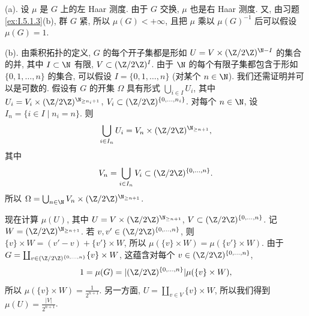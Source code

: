 \begin{solution}
(a). 设 $\mu$ 是 $G$ 上的左 Haar 测度. 由于 $G$ 交换, $\mu$ 也是右 Haar 测度. 又, 由习题 \ref{ex:I.5.1.3}(b), 群 $G$ 紧, 所以 $\mu(G) < +\infty$, 且把 $\mu$ 乘以 $\mu(G)^{-1}$ 后可以假设 $\mu(G) = 1$.

(b). 由乘积拓扑的定义, $G$ 的每个开子集都是形如 $U = V \times (\Z/2\Z)^{\N - I}$ 的集合的并, 其中 $I \subset \N$ 有限, $V \subset (\Z/2\Z)^I$. 由于 $\N$ 的每个有限子集都包含于形如 $\{0,1,\ldots,n\}$ 的集合, 可以假设 $I = \{0,1,\ldots,n\}$ (对某个 $n \in \N$). 我们还需证明并可以是可数的. 假设有 $G$ 的开集 $\Omega$ 具有形式 $\bigcup_{i \in I}U_i$, 其中 $U_i = V_i \times (\Z/2\Z)^{\N_{\geq n_i+1}}$, $V_i \subset (\Z/2\Z)^{\{0,\ldots,n_i\}}$. 对每个 $n \in \N$, 设 $I_n = \{i \in I \mid n_i = n\}$. 则
\[
\bigcup_{i \in I_n}U_i = V_n \times (\Z/2\Z)^{\N_{\geq n+1}},
\]
其中
\[
V_n = \bigcup_{i \in I_n}V_i \subset (\Z/2\Z)^{\{0,\ldots,n\}}.
\]
所以 $\Omega = \bigcup_{n \in \N}V_n \times (\Z/2\Z)^{\N_{\geq n+1}}$.

现在计算 $\mu(U)$, 其中 $U = V \times (\Z/2\Z)^{\N_{\geq n+1}}$, $V \subset (\Z/2\Z)^{\{0,\ldots,n\}}$. 记 $W = (\Z/2\Z)^{\N_{\geq n+1}}$. 若 $v, v' \in (\Z/2\Z)^{\{0,\ldots,n\}}$, 则 $\{v\} \times W = (v' - v) + \{v'\} \times W$, 所以 $\mu(\{v\} \times W) = \mu(\{v'\} \times W)$. 由于 $G = \coprod_{v \in (\Z/2\Z)^{\{0,\ldots,n\}}}\{v\} \times W$, 这蕴含对每个 $v \in (\Z/2\Z)^{\{0,\ldots,n\}}$,
\[
1 = \mu(G) = |(\Z/2\Z)^{\{0,\ldots,n\}}|\mu(\{v\} \times W),
\]
所以 $\mu(\{v\} \times W) = \frac{1}{2^{n+1}}$. 另一方面, $U = \coprod_{v \in V}\{v\} \times W$, 所以我们得到 $\mu(U) = \frac{|V|}{2^{n+1}}$.


\end{solution}
